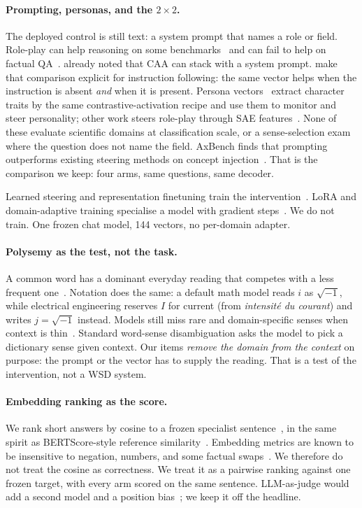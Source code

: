 \documentclass{article} %
\begin{document}
\paragraph{Prompting, personas, and the $2\times 2$.}
The deployed control is still text: a system prompt that names a role or field.
Role-play can help reasoning on some benchmarks~\citep{kong2024roleplay} and can fail to help on factual QA~\citep{zheng2024personas}.
\citet{rimsky2024caa} already noted that CAA can stack with a system prompt.
\citet{stolfo2025instruction} make that comparison explicit for instruction following: the same vector helps when the instruction is absent \emph{and} when it is present.
Persona vectors~\citep{chen2025persona} extract character traits by the same contrastive-activation recipe and use them to monitor and steer personality; other work steers role-play through SAE features~\citep{wang2025sta}.
None of these evaluate scientific domains at classification scale, or a sense-selection exam where the question does not name the field.
AxBench finds that prompting outperforms existing steering methods on concept injection~\citep{wu2025axbench}.
That is the comparison we keep: four arms, same questions, same decoder.

Learned steering and representation finetuning train the intervention~\citep{cao2024bipo,wu2024reft}.
LoRA and domain-adaptive training specialise a model with gradient steps~\citep{hu2022lora}.
We do not train.
One frozen chat model, 144 vectors, no per-domain adapter.

\paragraph{Polysemy as the test, not the task.}
A common word has a dominant everyday reading that competes with a less frequent one~\citep{rodd2002ambiguity,bevilacqua2021wsd}.
Notation does the same: a default math model reads $i$ as $\sqrt{-1}$, while electrical engineering reserves $I$ for current (from \emph{intensit\'e du courant}) and writes $j=\sqrt{-1}$ instead.
Models still miss rare and domain-specific senses when context is thin~\citep{campolungo2022mwt,meconi2025wsd}.
Standard word-sense disambiguation asks the model to pick a dictionary sense given context.
Our items \emph{remove the domain from the context} on purpose: the prompt or the vector has to supply the reading.
That is a test of the intervention, not a WSD system.

\paragraph{Embedding ranking as the score.}
We rank short answers by cosine to a frozen specialist sentence~\citep{reimers2019sbert,song2020mpnet}, in the same spirit as BERTScore-style reference similarity~\citep{zhang2020bertscore}.
Embedding metrics are known to be insensitive to negation, numbers, and some factual swaps~\citep{hanna2021bertscore,he2023blindspots}.
We therefore do not treat the cosine as correctness.
We treat it as a pairwise ranking against one frozen target, with every arm scored on the same sentence.
LLM-as-judge would add a second model and a position bias~\citep{zheng2023judge}; we keep it off the headline.
\end{document}
